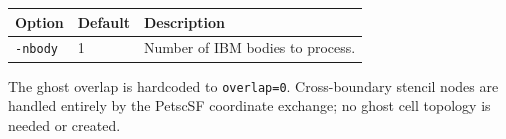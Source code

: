 \documentclass[11pt]{article}
\begin{document}
\begin{center}
\begin{tabular}{lll}
\toprule
Option & Default & Description \\
\midrule
\texttt{-nbody} & 1 & Number of IBM bodies to process. \\
\bottomrule
\end{tabular}
\end{center}

The ghost overlap is hardcoded to \texttt{overlap=0}.  Cross-boundary stencil nodes
are handled entirely by the PetscSF coordinate exchange; no ghost cell topology
is needed or created.
\end{document}
